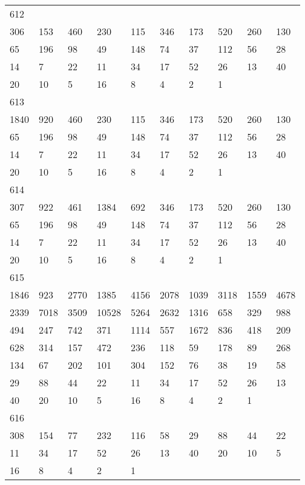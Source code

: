 \begin{longtable}{*{10}{l}}
612&&&&&&&&&\\
306& 153& 460& 230& 115& 346& 173& 520& 260& 130\\
65& 196& 98& 49& 148& 74& 37& 112& 56& 28\\
14& 7& 22& 11& 34& 17& 52& 26& 13& 40\\
20& 10& 5& 16& 8& 4& 2& 1& \\

613&&&&&&&&&\\
1840& 920& 460& 230& 115& 346& 173& 520& 260& 130\\
65& 196& 98& 49& 148& 74& 37& 112& 56& 28\\
14& 7& 22& 11& 34& 17& 52& 26& 13& 40\\
20& 10& 5& 16& 8& 4& 2& 1& \\

614&&&&&&&&&\\
307& 922& 461& 1384& 692& 346& 173& 520& 260& 130\\
65& 196& 98& 49& 148& 74& 37& 112& 56& 28\\
14& 7& 22& 11& 34& 17& 52& 26& 13& 40\\
20& 10& 5& 16& 8& 4& 2& 1& \\

615&&&&&&&&&\\
1846& 923& 2770& 1385& 4156& 2078& 1039& 3118& 1559& 4678\\
2339& 7018& 3509& 10528& 5264& 2632& 1316& 658& 329& 988\\
494& 247& 742& 371& 1114& 557& 1672& 836& 418& 209\\
628& 314& 157& 472& 236& 118& 59& 178& 89& 268\\
134& 67& 202& 101& 304& 152& 76& 38& 19& 58\\
29& 88& 44& 22& 11& 34& 17& 52& 26& 13\\
40& 20& 10& 5& 16& 8& 4& 2& 1& \\

616&&&&&&&&&\\
308& 154& 77& 232& 116& 58& 29& 88& 44& 22\\
11& 34& 17& 52& 26& 13& 40& 20& 10& 5\\
16& 8& 4& 2& 1& \\


\end{longtable}
